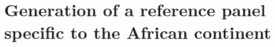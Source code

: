 \chapter{Generation of a reference panel specific to the African continent}
\label{ch:reference_panel}









